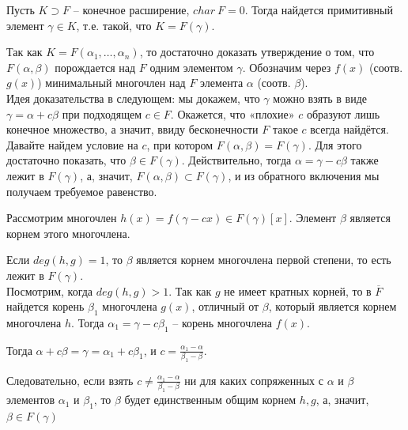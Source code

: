 \Th Пусть $K \supset F$ -- конечное расширение, $char \ F = 0$. Тогда найдется примитивный элемент $\gamma \in K$, т.е. такой, что $K = F(\gamma)$.

\Proof
Так как $K = F(\alpha_1, \ldots, \alpha_n)$, то достаточно доказать утверждение о том, что $F(\alpha, \beta)$ порождается над $F$ одним элементом $\gamma$. Обозначим через $f(x)$ (соотв. $g(x)$) минимальный многочлен над $F$ элемента $\alpha$ (соотв. $\beta$).\\

Идея доказательства в следующем: мы докажем, что $\gamma$ можно взять в виде $\gamma = \alpha + c\beta$ при подходящем
$c \in F$. Окажется, что «плохие» $c$ образуют лишь конечное множество, а значит, ввиду бесконечности $F$ такое $c$ всегда найдётся.\\

Давайте найдем условие на $c$, при котором $F(\alpha, \beta) = F(\gamma)$. Для этого достаточно показать, что $\beta \in F(\gamma)$. Действительно, тогда $\alpha = \gamma - c\beta$ также лежит в $F(\gamma)$, а, значит, $F(\alpha, \beta) \subset F(\gamma)$, и из обратного включения мы получаем требуемое равенство.

Рассмотрим многочлен $h(x) = f(\gamma - cx) \in F(\gamma)[x]$. Элемент $\beta$ является корнем этого многочлена.

Если $deg(h, g) = 1$, то $\beta$ является корнем многочлена первой степени, то есть лежит в $F(\gamma)$.\\

Посмотрим, когда $deg(h, g) > 1$. Так как $g$ не имеет кратных корней, то в $\overline{F}$ найдется корень $\beta_1$ многочлена $g(x)$, отличный от $\beta$, который  является корнем многочлена $h$. Тогда $\alpha_1 = \gamma - c\beta_1$ -- корень многочлена $f(x)$. 

Тогда $\alpha + c\beta = \gamma = \alpha_1 + c\beta_1$, и $c = \frac{\alpha_1 - \alpha}{\beta_1 - \beta}$.

Следовательно, если взять $c \neq \frac{\alpha_1 - \alpha}{\beta_1 - \beta}$ ни для каких сопряженных с $\alpha$ и $\beta$ элементов $\alpha_1$ и $\beta_1$, то $\beta$ будет единственным общим корнем $h, g$, а, значит, $\beta \in F(\gamma)$
\EndProof